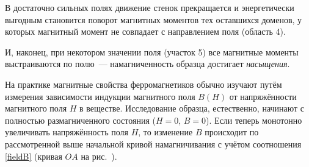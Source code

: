 
В достаточно сильных полях движение стенок прекращается и энергетически
выгодным становится поворот магнитных моментов тех оставшихся доменов, у которых
магнитный момент не совпадает с направлением поля (область 4).

И, наконец, при некотором значении поля (участок 5) все магнитные моменты
выстраиваются по полю~--- намагниченность образца достигает \emph{насыщения}.

%
%
%
%
%

На практике магнитные свойства ферромагнетиков обычно изучают путём измерения
зависимости индукции магнитного поля $B(H)$ от напряжённости магнитного поля $H$ в
веществе. Исследование образца, естественно, начинают с полностью
размагниченного состояния ($H = 0$, $B = 0$). Если теперь монотонно увеличивать
напряжённость поля $H$, то изменение $B$ происходит по рассмотренной выше
начальной кривой намагничивания с учётом соотношения \eqref{fieldB}
(кривая $OA$ на рис.~).

